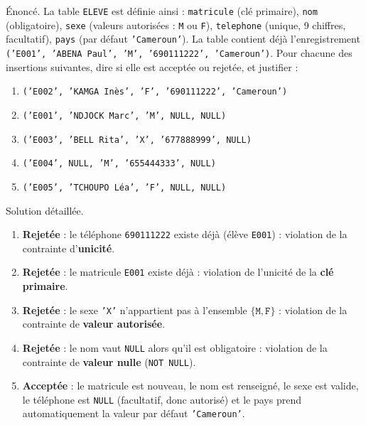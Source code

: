 \documentclass[11pt]{article}
\begin{document}
\begin{exoresolu}
Énoncé. La table \texttt{ELEVE} est définie ainsi : \texttt{matricule} (clé primaire), \texttt{nom} (obligatoire), \texttt{sexe} (valeurs autorisées : \texttt{M} ou \texttt{F}), \texttt{telephone} (unique, 9 chiffres, facultatif), \texttt{pays} (par défaut \texttt{'Cameroun'}). La table contient déjà l'enregistrement \texttt{('E001', 'ABENA Paul', 'M', '690111222', 'Cameroun')}. Pour chacune des insertions suivantes, dire si elle est acceptée ou rejetée, et justifier :
\begin{enumerate}
  \item \texttt{('E002', 'KAMGA Inès', 'F', '690111222', 'Cameroun')}
  \item \texttt{('E001', 'NDJOCK Marc', 'M', NULL, NULL)}
  \item \texttt{('E003', 'BELL Rita', 'X', '677888999', NULL)}
  \item \texttt{('E004', NULL, 'M', '655444333', NULL)}
  \item \texttt{('E005', 'TCHOUPO Léa', 'F', NULL, NULL)}
\end{enumerate}
\tcblower
Solution détaillée.
\begin{enumerate}
  \item \textbf{Rejetée} : le téléphone \texttt{690111222} existe déjà (élève \texttt{E001}) : violation de la contrainte d'\textbf{unicité}.
  \item \textbf{Rejetée} : le matricule \texttt{E001} existe déjà : violation de l'unicité de la \textbf{clé primaire}.
  \item \textbf{Rejetée} : le sexe \texttt{'X'} n'appartient pas à l'ensemble $\{\texttt{M}, \texttt{F}\}$ : violation de la contrainte de \textbf{valeur autorisée}.
  \item \textbf{Rejetée} : le nom vaut \texttt{NULL} alors qu'il est obligatoire : violation de la contrainte de \textbf{valeur nulle} (\texttt{NOT NULL}).
  \item \textbf{Acceptée} : le matricule est nouveau, le nom est renseigné, le sexe est valide, le téléphone est \texttt{NULL} (facultatif, donc autorisé) et le pays prend automatiquement la valeur par défaut \texttt{'Cameroun'}.
\end{enumerate}
\end{exoresolu}
\end{document}
